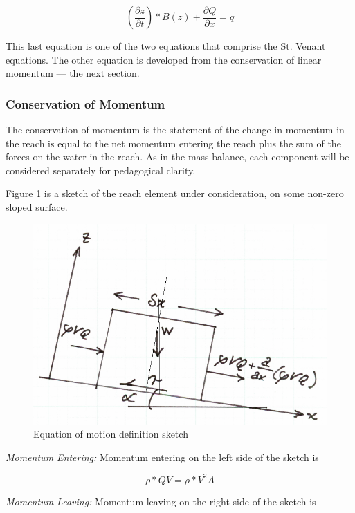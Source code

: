 \begin{equation}
( \frac{\partial z}{\partial t}) *B(z) + \frac{\partial Q}{\partial x} = q
\label{eqn:continunity}
\end{equation}

This last equation is one of the two equations that comprise the St. Venant equations.  The other equation is developed from the conservation of linear momentum --- the next section.

\subsubsection{Conservation of Momentum}
The conservation of momentum is the statement of the change in momentum in the reach is equal to the net momentum entering the reach plus the sum of the forces on the water in the reach.  As in the mass balance, each component will be considered separately for pedagogical clarity.

Figure \ref{fig:motion_sketch} is a sketch of the reach element under consideration, on some non-zero sloped surface.  
\begin{figure}[h!] %
   \centering
   \includegraphics[width=5in]{motion_sketch1.jpg} 
   \caption{Equation of motion definition sketch}
   \label{fig:motion_sketch}
\end{figure}

\textsl{Momentum Entering:} 
Momentum entering on the left side of the sketch is 

\begin{equation}
\rho*QV = \rho*V^2A
\end{equation}


\textsl{Momentum Leaving:} 
Momentum leaving on the right side of the sketch is 

